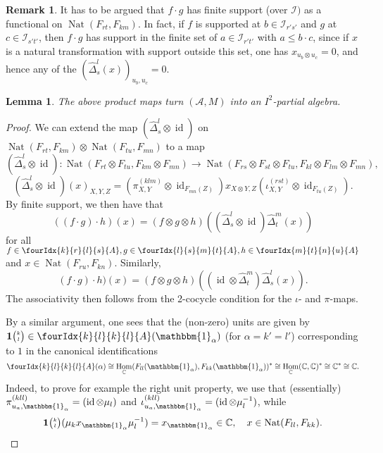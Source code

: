 \documentclass[10pt]{article}
\DeclareMathOperator{\id}{id}
\DeclareMathOperator{\Hom}{Hom}
\DeclareMathOperator{\Nat}{\mathrm{Nat}}
\newcommand{\C}{\mathbb{C}}
\newcommand{\Grt}[3]{#1{\tiny {\begin{pmatrix} #2\\#3\end{pmatrix}}}}
\newcommand{\Unitb}{\mathbbm{1}}
\newcommand{\UnitC}[2]{\Grt{\mathbf{1}}{#1}{#2}}
\newcommand{\Gr}[5]{\fourIdx{#2}{#4}{#3}{#5}{#1}}%
\newtheorem{Lem}[Theorem]{Lemma}
\theoremstyle{definition}
\newtheorem{Rem}[Theorem]{Remark}
\numberwithin{equation}{section}
\begin{document}
\begin{Rem} It has to be argued that $f\cdot g$ has finite support (over $\mathcal{I})$ as a functional on $\Nat(F_{rt},F_{km})$. In fact, if $f$ is supported at $b\in \mathcal{I}_{r's'}$ and $g$ at $c\in \mathcal{I}_{s't'}$, then $f\cdot g$ has support in the finite set of $a\in \mathcal{I}_{r't'}$ with $a\leq b\cdot c$, since if $x$ is a natural transformation with support outside this set, one has $x_{u_b\otimes u_c}=0$, and hence any of the $\left(\hat{\Delta}^l_s(x)\right)_{u_b,u_c} =0$.
\end{Rem}

\begin{Lem} The above product maps turn $(\mathscr{A},M)$ into an $I^2$-partial algebra.
\end{Lem}
\begin{proof} We can extend the map $(\hat{\Delta}^l_s\otimes \id)$ on $\Nat(F_{rt},F_{km})\otimes \Nat(F_{tu},F_{mn})$ to a map \[(\hat{\Delta}^l_s\otimes \id): \Nat(F_{rt}\otimes F_{tu},F_{km}\otimes F_{mn}) \rightarrow  \Nat(F_{rs}\otimes F_{st}\otimes F_{tu},F_{kl}\otimes F_{lm}\otimes F_{mn}),\] \[(\hat{\Delta}^l_s\otimes \id)(x)_{X,Y,Z} = \left(\pi^{(klm)}_{X,Y}\otimes \id_{F_{mn}(Z)}\right) x_{X\otimes Y, Z} \left(\iota^{(rst)}_{X,Y} \otimes \id_{F_{tu}(Z)}\right).\]
By finite support, we then have that \[((f\cdot g)\cdot h)(x) = (f\otimes g\otimes h)((\hat{\Delta}^l_s\otimes \id)\hat{\Delta}^m_t(x))\] for all $f\in \Gr{A}{k}{l}{r}{s},g\in \Gr{A}{l}{m}{s}{t},h\in \Gr{A}{m}{n}{t}{u}$ and $x\in  \Nat(F_{ru},F_{kn})$. Similarly, \[(f\cdot g)\cdot h)(x) = (f\otimes g\otimes h)((\id\otimes \hat{\Delta}^m_t)\hat{\Delta}^l_s(x)).\] The associativity then follows from the 2-cocycle condition for the $\iota$- and $\pi$-maps. 

By a similar argument, one sees that the (non-zero) units are given by $\UnitC{k}{l}\in \Gr{A}{k}{k}{l}{l}(\Unitb_{\alpha})$  (for $\alpha=k'=l'$) corresponding to $1$ in the canonical identifications  \[\Gr{A}{k}{k}{l}{l}(\alpha) \cong \Hom_{\C}(F_{ll}(\Unitb_{\alpha}),F_{kk}(\Unitb_{\alpha}))^*\cong \Hom_{\C}(\C,\C)^*  \cong \C^* \cong \C.\] Indeed, to prove for example the right unit property, we use that (essentially) $\pi_{u_a,\Unitb_{\alpha}}^{(kll)} =(\id\otimes \mu_l)$ and $\iota_{u_a,\Unitb_{\alpha}}^{(kll)} = (\id\otimes \mu_l^{-1})$, while \[\UnitC{k}{l}(\mu_kx_{\Unitb_{\alpha}}\mu_l^{-1}) = x_{\Unitb_{\alpha}} \in \C,\quad x\in \Nat(F_{ll},F_{kk}).\] %
\end{proof} 
\end{document}
